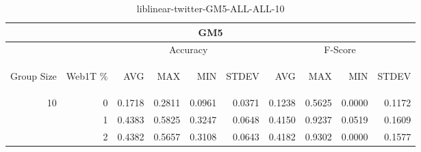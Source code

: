 \begin{center}
\begin{table}[htbp] 
 \begin{center}
\begin{tabular}{ | r | r | r | r | r | r | r | r | r | r |}
\hline
\multicolumn{10}{|c|}{GM5}\\
\hline
 & & \multicolumn{4}{|c|}{Accuracy} & \multicolumn{4}{|c|}{F-Score}\\ \cline{3-10}
\begin{sideways}Group Size\end{sideways} & \begin{sideways}Web1T \%\end{sideways} & \begin{sideways}AVG\end{sideways} & \begin{sideways}MAX\end{sideways} & \begin{sideways}MIN\end{sideways} & \begin{sideways}STDEV\end{sideways} & \begin{sideways}AVG\end{sideways} & \begin{sideways}MAX\end{sideways} & \begin{sideways}MIN\end{sideways} & \begin{sideways}STDEV\end{sideways}\\
\hline
\multirow{2}{*}{10}
 & 0 & 0.1718 & 0.2811 & 0.0961 & 0.0371 & 0.1238 & 0.5625 & 0.0000 & 0.1172\\ \cline{2-10}
 & 1 & 0.4383 & 0.5825 & 0.3247 & 0.0648 & 0.4150 & 0.9237 & 0.0519 & 0.1609\\ \cline{2-10}
 & 2 & 0.4382 & 0.5657 & 0.3108 & 0.0643 & 0.4182 & 0.9302 & 0.0000 & 0.1577\\ \cline{2-10}
\hline
\end{tabular}
\caption{liblinear-twitter-GM5-ALL-ALL-10}
\label{table:liblinear-twitter-GM5-ALL-ALL-10}
\end{center}
 \end{table}
\end{center}

